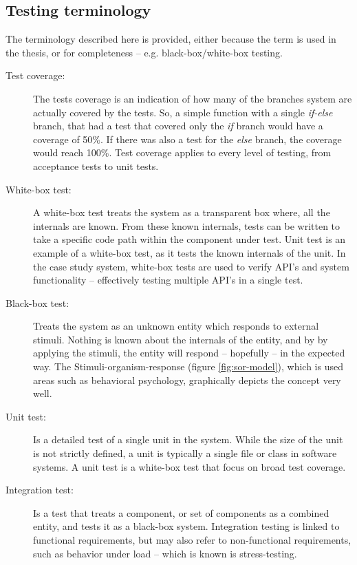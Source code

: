 \subsection{Testing terminology}
\label{ssec:testing-terminology}
The terminology described here is provided, either because the term is used in the thesis, or for completeness -- e.g. black-box/white-box testing.
\begin{description}

  \item[Test coverage:] The tests coverage is an indication of how many of the branches system are actually covered by the tests. So, a simple function with a single \emph{if-else} branch, that had a test that covered only the \emph{if} branch would have a coverage of 50\%. If there was also a test for the \emph{else} branch, the coverage would reach 100\%. Test coverage applies to every level of testing, from acceptance tests to unit tests.

  \item[White-box test:] A white-box test treats the system as a transparent box where, all the internals are known. From these known internals, tests can be written to take a specific code path within the component under test. Unit test is an example of a white-box test, as it tests the known internals of the unit. In the case study system, white-box tests are used to verify API's and system functionality -- effectively testing multiple API's in a single test.

  \item[Black-box test:] Treats the system as an unknown entity which responds to external stimuli. Nothing is known about the internals of the entity, and by by applying the stimuli, the entity will respond -- hopefully -- in the expected way. The Stimuli-organism-response (figure \ref{fig:sor-model}), which is used areas such as behavioral psychology, graphically depicts the concept very well.

  \item[Unit test:] Is a detailed test of a single unit in the system. While the size of the unit is not strictly defined, a unit is typically a single file or class in software systems. A unit test is a white-box test that focus on broad test coverage.

  \item[Integration test:] Is a test that treats a component, or set of components as a combined entity, and tests it as a black-box system. Integration testing is linked to functional requirements, but may also refer to non-functional requirements, such as behavior under load -- which is known is stress-testing.


\end{description}
